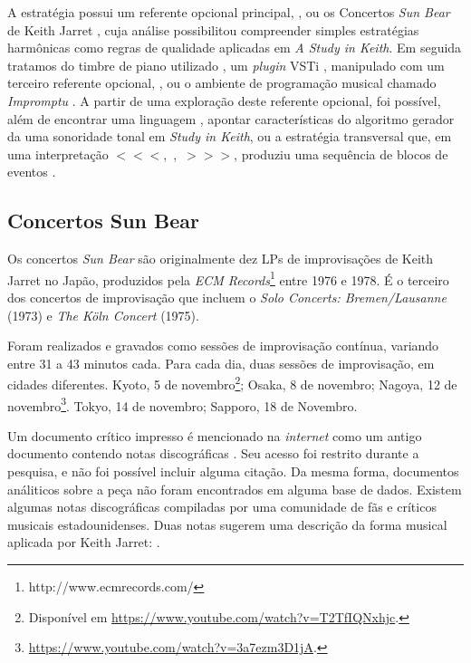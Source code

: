 A estratégia possui um referente opcional principal, , ou os Concertos \emph{Sun Bear}  de Keith Jarret , cuja análise possibilitou compreender simples estratégias harmônicas como regras de qualidade aplicadas em \emph{A Study in Keith}. Em seguida tratamos do timbre de piano utilizado , um \emph{plugin} VSTi , manipulado com um terceiro referente opcional, , ou o ambiente de programação musical chamado \emph{Impromptu} . A partir de uma exploração deste referente opcional, foi possível, além de encontrar uma linguagem , apontar características do algoritmo gerador da uma sonoridade tonal em \emph{Study in Keith}, ou a estratégia transversal  que, em uma interpretação $<<<$,~,~$>>>$, produziu uma sequência de blocos de eventos  .

\subsection{Concertos Sun Bear}\label{sec:sunbearanal}

Os concertos \emph{Sun Bear} são originalmente dez LPs  de improvisações de Keith Jarret no Japão, produzidos pela \emph{ECM Records}\footnote{http://www.ecmrecords.com/} entre 1976 e 1978. É o terceiro dos concertos de improvisação que incluem o \emph{Solo Concerts: Bremen/Lausanne} (1973) e \emph{The Köln Concert} (1975).

Foram realizados e gravados como sessões de improvisação contínua, variando entre 31 a 43 minutos cada. Para cada dia, duas sessões de improvisação, em cidades diferentes. Kyoto, 5 de novembro\footnote{Disponível em \url{https://www.youtube.com/watch?v=T2TfIQNxhjc}.}; Osaka, 8 de novembro; Nagoya, 12 de novembro\footnote{\url{https://www.youtube.com/watch?v=3a7ezm3D1jA}.}. Tokyo, 14 de novembro; Sapporo, 18 de Novembro.


Um documento crítico impresso é mencionado na \emph{internet} como um antigo documento contendo notas discográficas \cite{rollingstone1985}. Seu acesso foi restrito durante a pesquisa, e não foi possível incluir alguma citação. Da mesma forma, documentos análiticos sobre a peça não foram encontrados em alguma base de dados. Existem algumas notas discográficas compiladas por uma comunidade de fãs e críticos musicais estadounidenses. Duas notas sugerem uma descrição da forma musical aplicada por Keith Jarret: \cite[p.~129]{jarret_discography_2014}. 

